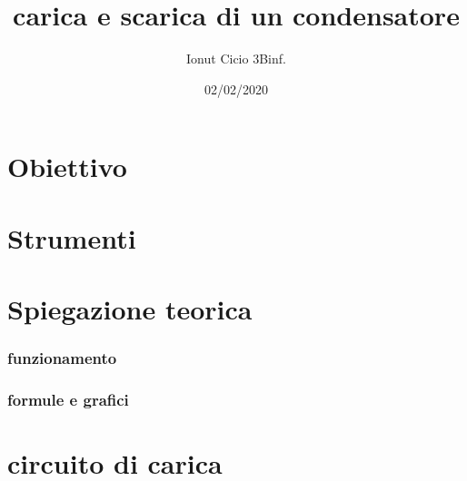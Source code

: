 \documentclass{article}
\begin{document}
\title{carica e scarica di un condensatore}
\author{Ionut Cicio 3Binf.}
\date{02/02/2020}

\maketitle

\section*{Obiettivo}
\blindtext[1]

\section*{Strumenti}
\blindtext[1]

\newpage
\section*{Spiegazione teorica}
\subsubsection*{funzionamento}
\blindtext[1]
\subsubsection*{formule e grafici}
\blindtext[1]


\newpage

\section*{circuito di carica}
\end{document}
